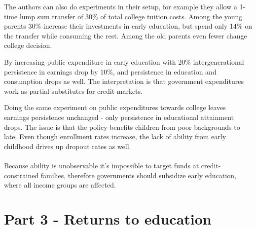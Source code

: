 \documentclass[12pt, a4paper]{article}
\begin{document}
\begin{multicols}{2}
The authors can also do experiments in their setup, for example they allow a 1-time lump sum transfer of 30\% of total college tuition costs. Among the young parents 30\% increase their investments in early education, but spend only 14\% on the transfer while consuming the rest. Among the old parents even fewer change college decision.

By increasing public expenditure in early education with 20\% intergenerational persistence in earnings drop by 10\%, and persistence in education and consumption drops as well. The interpretation is that government expenditures work as partial substitutes for credit markets.

Doing the same experiment on public expenditures towards college leaves earnings persistence unchanged - only persistence in educational attainment drops. The issue is that the policy benefits children from poor backgrounds to late. Even though enrollment rates increase, the lack of ability from early childhood drives up dropout rates as well.
\\ \\
Because ability is unobservable it's impossible to target funds at credit-constrained families, therefore governments should subsidize early education, where all income groups are affected.

\section{Part 3 - Returns to education}

\end{multicols}
\end{document}

